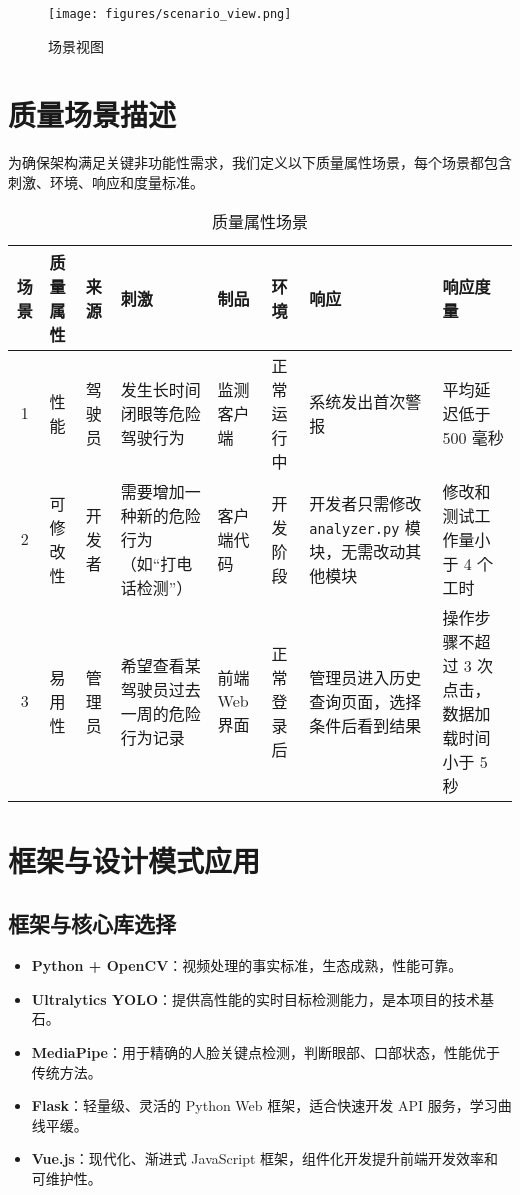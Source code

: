 \documentclass[a4paper,12pt]{article}
\begin{document}
\begin{figure}[h]
  \centering
  \texttt{[image: figures/scenario\_view.png]}
  \caption{场景视图}
  \label{fig:scenario_view}
\end{figure}

\section{质量场景描述}
为确保架构满足关键非功能性需求，我们定义以下质量属性场景，每个场景都包含刺激、环境、响应和度量标准。

\begin{table}[H]
  \centering
  \small %
  \caption{质量属性场景}
  \label{tab:quality_scenarios}
  \begin{tabularx}{\textwidth}{|c|X|X|X|X|X|X|X|} %
    \hline
    \textbf{场景} & \textbf{质量属性} & \textbf{来源} & \textbf{刺激} & \textbf{制品} & \textbf{环境} & \textbf{响应} & \textbf{响应度量} \\
    \hline
    1 & 性能 & 驾驶员 & 发生长时间闭眼等危险驾驶行为 & 监测客户端 & 正常运行中 & 系统发出首次警报 & 平均延迟低于 500 毫秒 \\
    \hline
    2 & 可修改性 & 开发者 & 需要增加一种新的危险行为（如“打电话检测”） & 客户端代码 & 开发阶段 & 开发者只需修改 \texttt{analyzer.py} 模块，无需改动其他模块 & 修改和测试工作量小于 4 个工时 \\
    \hline
    3 & 易用性 & 管理员 & 希望查看某驾驶员过去一周的危险行为记录 & 前端 Web 界面 & 正常登录后 & 管理员进入历史查询页面，选择条件后看到结果 & 操作步骤不超过 3 次点击，数据加载时间小于 5 秒 \\
    \hline
  \end{tabularx}
\end{table}

\section{框架与设计模式应用}
\subsection{框架与核心库选择}
\begin{itemize}
  \item \textbf{Python + OpenCV}：视频处理的事实标准，生态成熟，性能可靠。
  \item \textbf{Ultralytics YOLO}：提供高性能的实时目标检测能力，是本项目的技术基石。
  \item \textbf{MediaPipe}：用于精确的人脸关键点检测，判断眼部、口部状态，性能优于传统方法。
  \item \textbf{Flask}：轻量级、灵活的 Python Web 框架，适合快速开发 API 服务，学习曲线平缓。
  \item \textbf{Vue.js}：现代化、渐进式 JavaScript 框架，组件化开发提升前端开发效率和可维护性。
\end{itemize}
\end{document}
